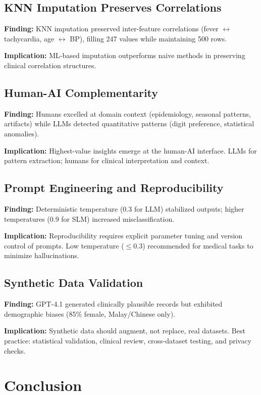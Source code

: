 \documentclass[10pt,a4paper]{article}
\begin{document}
\subsection{KNN Imputation Preserves Correlations}

\textbf{Finding:} KNN imputation preserved inter-feature correlations (fever $\leftrightarrow$ tachycardia, age $\leftrightarrow$ BP), filling 247 values while maintaining 500 rows.

\textbf{Implication:} ML-based imputation outperforms naive methods in preserving clinical correlation structures.

\subsection{Human-AI Complementarity}

\textbf{Finding:} Humans excelled at domain context (epidemiology, seasonal patterns, artifacts) while LLMs detected quantitative patterns (digit preference, statistical anomalies).

\textbf{Implication:} Highest-value insights emerge at the human-AI interface. LLMs for pattern extraction; humans for clinical interpretation and context.

\subsection{Prompt Engineering and Reproducibility}

\textbf{Finding:} Deterministic temperature (0.3 for LLM) stabilized outputs; higher temperatures (0.9 for SLM) increased misclassification.

\textbf{Implication:} Reproducibility requires explicit parameter tuning and version control of prompts. Low temperature ($\leq 0.3$) recommended for medical tasks to minimize hallucinations.


\subsection{Synthetic Data Validation}

\textbf{Finding:} GPT-4.1 generated clinically plausible records but exhibited demographic biases (85\% female, Malay/Chinese only).

\textbf{Implication:} Synthetic data should augment, not replace, real datasets. Best practice: statistical validation, clinical review, cross-dataset testing, and privacy checks.

\section{Conclusion}
\end{document}
